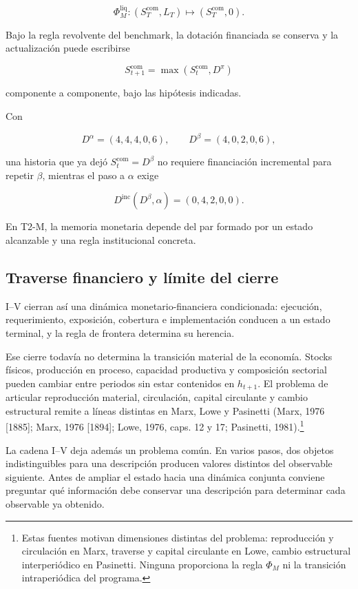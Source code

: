 \documentclass[10pt,a5paper,twoside]{article}
\begin{document}
\[
\Phi_M^{\mathrm{liq}}
:
(S_T^{\mathrm{com}},L_T)
\mapsto
(S_T^{\mathrm{com}},0).
\]

Bajo la regla revolvente del benchmark, la dotación financiada se
conserva y la actualización puede escribirse

\[
S_{t+1}^{\mathrm{com}}
=
\max(S_t^{\mathrm{com}},D^\pi)
\]

componente a componente, bajo las hipótesis indicadas.

Con

\[
D^\alpha=(4,4,4,0,6),
\qquad
D^\beta=(4,0,2,0,6),
\]

una historia que ya dejó \(S_t^{\mathrm{com}}=D^\beta\) no requiere
financiación incremental para repetir \(\beta\), mientras el paso a
\(\alpha\) exige

\[
D^{\mathrm{inc}}(D^\beta,\alpha)
=
(0,4,2,0,0).
\]

En T2-M, la memoria monetaria depende del par formado por un estado alcanzable
y una regla institucional concreta.

\subsection{Traverse financiero y límite del cierre}\label{traverse-financiero-y-luxedmite-del-cierre}

I--V cierran así una dinámica monetario-financiera condicionada: ejecución,
requerimiento, exposición, cobertura e implementación conducen a un estado
terminal, y la regla de frontera determina su herencia.

Ese cierre todavía no determina la transición material de la economía. Stocks
físicos, producción en proceso, capacidad productiva y composición sectorial
pueden cambiar entre periodos sin estar contenidos en \(h_{t+1}\). El problema de articular reproducción material,
circulación, capital circulante y cambio estructural remite a líneas
distintas en Marx, Lowe y Pasinetti (Marx, 1976 {[}1885{]}; Marx, 1976
{[}1894{]}; Lowe, 1976, caps. 12 y 17; Pasinetti, 1981).\footnote{Estas
  fuentes motivan dimensiones distintas del problema: reproducción y
  circulación en Marx, traverse y capital circulante en Lowe, cambio
  estructural interperiódico en Pasinetti. Ninguna proporciona la regla
  \(\Phi_M\) ni la transición intraperiódica del programa.}

La cadena I--V deja además un problema común. En varios pasos, dos objetos
indistinguibles para una descripción producen valores distintos del observable
siguiente. Antes de ampliar el estado hacia una dinámica conjunta conviene
preguntar qué información debe conservar una descripción para determinar cada
observable ya obtenido.
\end{document}
